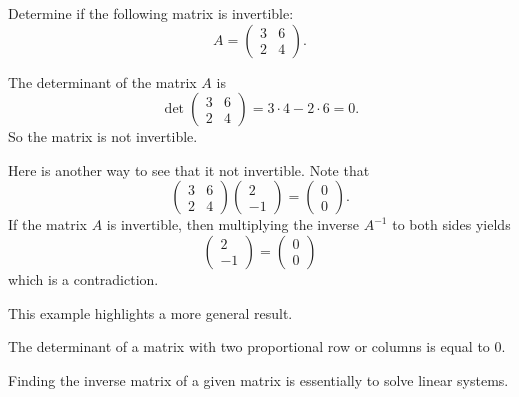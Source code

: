 \begin{example}
  Determine if the following matrix is invertible:
  \[
    A=
  \begin{pmatrix}
    3 & 6 \\
    2 & 4
  \end{pmatrix}.  
  \]
\end{example}
\begin{solution}
  The determinant of the matrix $A$ is
  \[
    \det\begin{pmatrix}
      3 & 6 \\
      2 & 4
    \end{pmatrix}=3\cdot 4-2\cdot 6=0.
  \]
  So the matrix is not invertible.

  Here is another way to see that it not invertible. Note that
\[\begin{pmatrix}
  3 & 6 \\
  2 & 4
\end{pmatrix}\begin{pmatrix}
  2\\ -1
\end{pmatrix}=\begin{pmatrix}
  0\\0
\end{pmatrix}.\]
If the matrix $A$ is invertible, then multiplying the inverse $A^{-1}$ to both sides yields
\[\begin{pmatrix}
  2\\ -1
\end{pmatrix}=\begin{pmatrix}
  0\\0
\end{pmatrix}\]
which is a contradiction.
\end{solution}

This example highlights a more general result.
\begin{theorem}
The determinant of a matrix with two proportional row or columns is equal to $0$.
\end{theorem}

Finding the inverse matrix of a given matrix is essentially to solve linear systems.

